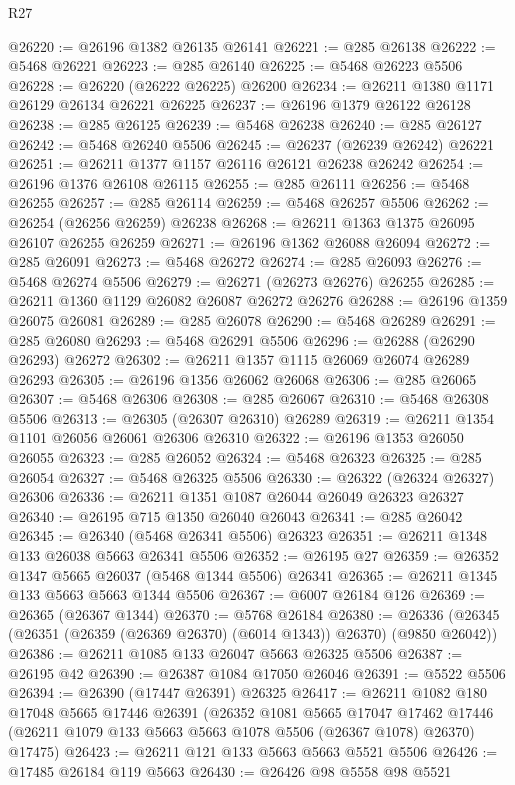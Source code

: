 \begin{lexlean}{R27}
\begin{coremodule}
@26220 := @26196 @1382 @26135 @26141
@26221 := @285 @26138
@26222 := @5468 @26221
@26223 := @285 @26140
@26225 := @5468 @26223 @5506
@26228 := @26220 (@26222 @26225) @26200
@26234 := @26211 @1380 @1171 @26129 @26134 @26221 @26225
@26237 := @26196 @1379 @26122 @26128
@26238 := @285 @26125
@26239 := @5468 @26238
@26240 := @285 @26127
@26242 := @5468 @26240 @5506
@26245 := @26237 (@26239 @26242) @26221
@26251 := @26211 @1377 @1157 @26116 @26121 @26238 @26242
@26254 := @26196 @1376 @26108 @26115
@26255 := @285 @26111
@26256 := @5468 @26255
@26257 := @285 @26114
@26259 := @5468 @26257 @5506
@26262 := @26254 (@26256 @26259) @26238
@26268 := @26211 @1363 @1375 @26095 @26107 @26255 @26259
@26271 := @26196 @1362 @26088 @26094
@26272 := @285 @26091
@26273 := @5468 @26272
@26274 := @285 @26093
@26276 := @5468 @26274 @5506
@26279 := @26271 (@26273 @26276) @26255
@26285 := @26211 @1360 @1129 @26082 @26087 @26272 @26276
@26288 := @26196 @1359 @26075 @26081
@26289 := @285 @26078
@26290 := @5468 @26289
@26291 := @285 @26080
@26293 := @5468 @26291 @5506
@26296 := @26288 (@26290 @26293) @26272
@26302 := @26211 @1357 @1115 @26069 @26074 @26289 @26293
@26305 := @26196 @1356 @26062 @26068
@26306 := @285 @26065
@26307 := @5468 @26306
@26308 := @285 @26067
@26310 := @5468 @26308 @5506
@26313 := @26305 (@26307 @26310) @26289
@26319 := @26211 @1354 @1101 @26056 @26061 @26306 @26310
@26322 := @26196 @1353 @26050 @26055
@26323 := @285 @26052
@26324 := @5468 @26323
@26325 := @285 @26054
@26327 := @5468 @26325 @5506
@26330 := @26322 (@26324 @26327) @26306
@26336 := @26211 @1351 @1087 @26044 @26049 @26323 @26327
@26340 := @26195 @715 @1350 @26040 @26043
@26341 := @285 @26042
@26345 := @26340 (@5468 @26341 @5506) @26323
@26351 := @26211 @1348 @133 @26038 @5663 @26341 @5506
@26352 := @26195 @27
@26359 := @26352 @1347 @5665 @26037 (@5468 @1344 @5506) @26341
@26365 := @26211 @1345 @133 @5663 @5663 @1344 @5506
@26367 := @6007 @26184 @126
@26369 := @26365 (@26367 @1344)
@26370 := @5768 @26184
@26380 := @26336 (@26345 (@26351 (@26359 (@26369 @26370) (@6014 @1343)) @26370) (@9850 @26042))
@26386 := @26211 @1085 @133 @26047 @5663 @26325 @5506
@26387 := @26195 @42
@26390 := @26387 @1084 @17050 @26046
@26391 := @5522 @5506
@26394 := @26390 (@17447 @26391) @26325
@26417 := @26211
    @1082
    @180
    @17048
    @5665
    @17446
    @26391
    (@26352
      @1081
      @5665
      @17047
      @17462
      @17446
      (@26211 @1079 @133 @5663 @5663 @1078 @5506 (@26367 @1078) @26370)
      @17475)
@26423 := @26211 @121 @133 @5663 @5663 @5521 @5506
@26426 := @17485 @26184 @119 @5663
@26430 := @26426 @98 @5558 @98 @5521

\end{coremodule}
\end{lexlean}
